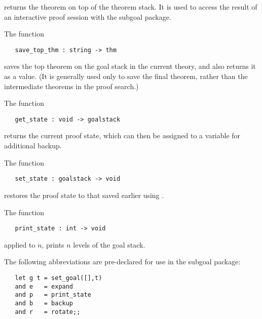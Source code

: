 \noindent returns the theorem on top of the theorem stack. It is used
to access the result of an interactive proof session
with the subgoal package.

The function

\begin{boxed}\begin{verbatim}
   save_top_thm : string -> thm
\end{verbatim}\end{boxed}


\noindent saves the top theorem on the goal stack in
the current theory, and also returns it as a value.
(It is
generally used only to save the final theorem,
rather than the intermediate theorems in the
proof search.)

The function

\begin{boxed}\begin{verbatim}
   get_state : void -> goalstack
\end{verbatim}\end{boxed}

\noindent returns the current proof state, which can then be
assigned to a variable
for additional backup.

The function

\begin{boxed}\begin{verbatim}
   set_state : goalstack -> void
\end{verbatim}\end{boxed}

\noindent restores the proof state to that saved earlier using .

The function

\begin{boxed}\begin{verbatim}
   print_state : int -> void
\end{verbatim}\end{boxed}
applied to $n$, prints $n$ levels of the goal stack.

The following abbreviations are pre-declared for use in the subgoal package:

\begin{hol}\begin{verbatim}
   let g t = set_goal([],t)
   and e   = expand
   and p   = print_state
   and b   = backup
   and r   = rotate;;
\end{verbatim}\end{hol}

